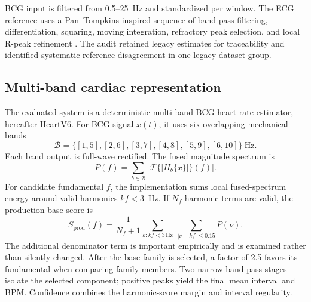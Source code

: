 \documentclass[10pt,twocolumn]{article}
\begin{document}
BCG input is filtered from 0.5--25~Hz and standardized per window. The ECG reference uses a Pan--Tompkins-inspired sequence of band-pass filtering, differentiation, squaring, moving integration, refractory peak selection, and local R-peak refinement \cite{pan1985qrs}. The audit retained legacy estimates for traceability and identified systematic reference disagreement in one legacy dataset group.

\subsection{Multi-band cardiac representation}
The evaluated system is a deterministic multi-band BCG heart-rate estimator, hereafter HeartV6. For BCG signal $x(t)$, it uses six overlapping mechanical bands
\begin{equation}
\mathcal{B}=\{[1,5],[2,6],[3,7],[4,8],[5,9],[6,10]\}\ \mathrm{Hz}.
\end{equation}
Each band output is full-wave rectified. The fused magnitude spectrum is
\begin{equation}
P(f)=\sum_{b\in\mathcal{B}}\left|\mathcal{F}\{|H_b\{x\}|\}(f)\right|.
\end{equation}
For candidate fundamental $f$, the implementation sums local fused-spectrum energy around valid harmonics $kf<3$~Hz. If $N_f$ harmonic terms are valid, the production base score is
\begin{equation}
S_{\mathrm{prod}}(f)=\frac{1}{N_f+1}
\sum_{k: kf<3\,\mathrm{Hz}}\ \sum_{|\nu-kf|\leq0.15}P(\nu).
\label{eq:score}
\end{equation}
The additional denominator term is important empirically and is examined rather than silently changed. After the base family is selected, a factor of 2.5 favors its fundamental when comparing family members. Two narrow band-pass stages isolate the selected component; positive peaks yield the final mean interval and BPM. Confidence combines the harmonic-score margin and interval regularity.
\end{document}
